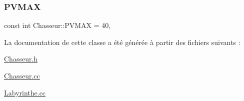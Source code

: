\subsubsection{\texorpdfstring{P\+V\+M\+AX}{PVMAX}}
{\footnotesize\ttfamily const int Chasseur\+::\+P\+V\+M\+AX = 40\hspace{0.3cm}{\ttfamily [static]}, {\ttfamily [private]}}



La documentation de cette classe a été générée à partir des fichiers suivants \+:\begin{DoxyCompactItemize}
\item 
\hyperlink{Chasseur_8h}{Chasseur.\+h}\item 
\hyperlink{Chasseur_8cc}{Chasseur.\+cc}\item 
\hyperlink{Labyrinthe_8cc}{Labyrinthe.\+cc}\end{DoxyCompactItemize}
